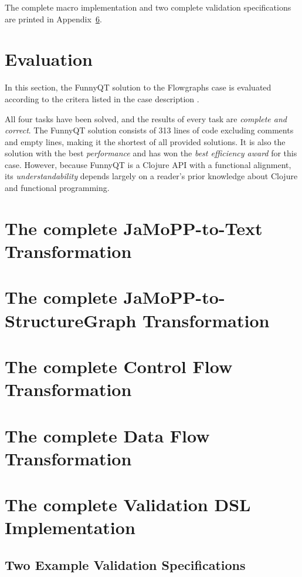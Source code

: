 \documentclass[submission]{eptcs}
\begin{document}
The complete macro implementation and two complete validation specifications
are printed in Appendix~\ref{sec:compl-valid-dsl}.


\section{Evaluation}
\label{sec:evaluation}

In this section, the FunnyQT solution to the Flowgraphs case is evaluated
according to the critera listed in the case description
\cite{flowgraphcasedesc}.

All four tasks have been solved, and the results of every task are
\emph{complete and correct}.  The FunnyQT solution consists of 313 lines of
code excluding comments and empty lines, making it the shortest of all provided
solutions.  It is also the solution with the best \emph{performance} and has
won the \emph{best efficiency award} for this case.  However, because FunnyQT
is a Clojure API with a functional alignment, its \emph{understandability}
depends largely on a reader's prior knowledge about Clojure and functional
programming.






\appendix
\newpage
\section{The complete JaMoPP-to-Text Transformation}
\label{sec:complete-jamopp-text}



\section{The complete JaMoPP-to-StructureGraph Transformation}
\label{sec:compl-jamopp-struct}



\section{The complete Control Flow Transformation}
\label{sec:compl-contr-flow}



\section{The complete Data Flow Transformation}
\label{sec:complete-data-flow}



\section{The complete Validation DSL Implementation}
\label{sec:compl-valid-dsl}



\subsection{Two Example Validation Specifications}
\label{sec:two-example-valid}


\end{document}
